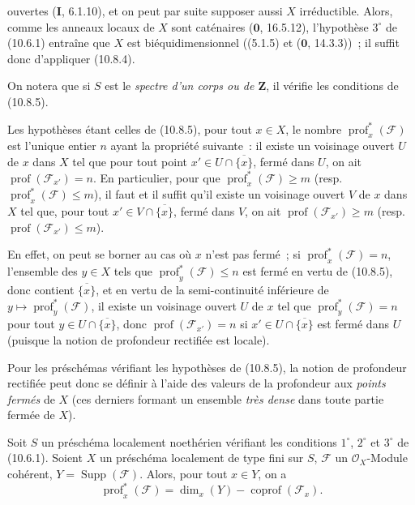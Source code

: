 ouvertes (\textbf{I}, 6.1.10), et on peut par suite supposer aussi $X$
irréductible. Alors, comme les anneaux locaux de $X$ sont caténaires
($\mathbf 0$, 16.5.12), l'hypothèse $3^\circ$ de (10.6.1) entraîne que $X$ est
biéquidimensionnel ((5.1.5) et ($\mathbf 0$, 14.3.3))~; il suffit donc d'appliquer
(10.8.4).

On notera que si $S$ est le \emph{spectre d'un corps ou de $\mathbf Z$}, il
vérifie les conditions de (10.8.5).

\begin{corollary}[10.8.6]
\label{IV.10.8.6-fr}
Les hypothèses étant celles de (10.8.5), pour tout $x\in X$, le nombre
$\operatorname{prof}^{*}_{x}(\mathcal F)$ est l'unique entier $n$ ayant la propriété
suivante~: il existe un voisinage ouvert $U$ de $x$ dans $X$ tel que pour tout
point $x'\in U\cap\overline{\{x\}}$, fermé dans $U$, on ait
$\operatorname{prof}(\mathcal F_{x'})=n$. En particulier, pour que
$\operatorname{prof}^{*}_{x}(\mathcal F)\geq m$ (resp.
$\operatorname{prof}^{*}_{x}(\mathcal F)\leq m$), il faut et il suffit qu'il existe
un voisinage ouvert $V$ de $x$ dans $X$ tel que, pour tout
$x'\in V\cap\overline{\{x\}}$, fermé dans $V$, on ait
$\operatorname{prof}(\mathcal F_{x'})\geq m$ (resp.
$\operatorname{prof}(\mathcal F_{x'})\leq m$).
\end{corollary}

En effet, on peut se borner au cas où $x$ n'est pas fermé~; si
$\operatorname{prof}^{*}_{x}(\mathcal F)=n$, l'ensemble des $y\in X$ tels que
$\operatorname{prof}^{*}_{y}(\mathcal F)\leq n$ est fermé en vertu de (10.8.5), donc
contient $\overline{\{x\}}$, et en vertu de la semi-continuité inférieure de
$y\mapsto\operatorname{prof}^{*}_{y}(\mathcal F)$, il existe un voisinage ouvert $U$
de $x$ tel que $\operatorname{prof}^{*}_{y}(\mathcal F)=n$ pour tout
$y\in U\cap\overline{\{x\}}$, donc $\operatorname{prof}(\mathcal F_{x'})=n$ si
$x'\in U\cap\overline{\{x\}}$ est fermé dans $U$ (puisque la notion de profondeur
rectifiée est locale).

Pour les préschémas vérifiant les hypothèses de (10.8.5), la notion de profondeur
rectifiée peut donc se définir à l'aide des valeurs de la profondeur aux
\emph{points fermés} de $X$ (ces derniers formant un ensemble \emph{très dense}
dans toute partie fermée de $X$).

\begin{proposition}[10.8.7]
\label{IV.10.8.7-fr}
Soit $S$ un préschéma localement noethérien vérifiant les conditions $1^\circ$,
$2^\circ$ et $3^\circ$ de (10.6.1). Soient $X$ un préschéma localement de type
fini sur $S$, $\mathcal F$ un $\mathcal O_X$-Module cohérent,
$Y=\operatorname{Supp}(\mathcal F)$. Alors, pour tout $x\in Y$, on a
\begin{equation}
\label{IV.10.8.7.1-fr}
\tag{10.8.7.1}
\operatorname{prof}^{*}_{x}(\mathcal F)
=\dim_x(Y)-\operatorname{coprof}(\mathcal F_x).
\end{equation}
\end{proposition}

